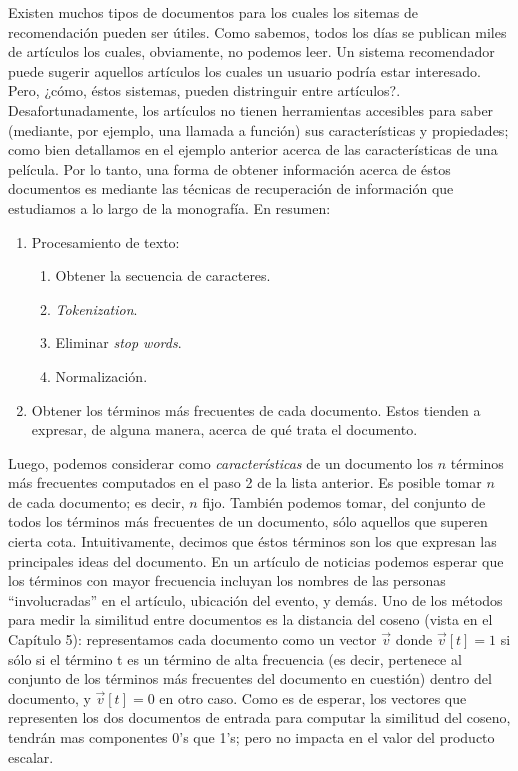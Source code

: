 			Existen muchos tipos de documentos para los cuales los sitemas de recomendación pueden ser útiles. Como sabemos, todos los días se publican miles de artículos los cuales, obviamente, no podemos leer. Un sistema recomendador puede sugerir aquellos artículos los cuales un usuario podría estar interesado. Pero, ¿cómo, éstos sistemas, pueden distringuir entre artículos?. Desafortunadamente, los artículos no tienen herramientas accesibles para saber (mediante, por ejemplo, una llamada a función) sus características y propiedades; como bien detallamos en el ejemplo anterior acerca de las características de una película. Por lo tanto, una forma de obtener información acerca de éstos documentos es mediante las técnicas de recuperación de información que estudiamos a lo largo de la monografía. En resumen:
			\begin{enumerate}
				\item Procesamiento de texto:
					\begin{enumerate}
						\item Obtener la secuencia de caracteres.
						\item \textit{Tokenization}.
						\item Eliminar \textit{stop words}.
						\item Normalización.
					\end{enumerate}			
				 \item Obtener los términos más frecuentes de cada documento. Estos tienden a expresar, de alguna manera, acerca de qué trata el documento.					
			\end{enumerate}
			Luego, podemos considerar como \textit{características} de un documento los $n$ términos más frecuentes computados en el paso 2 de la lista anterior. Es posible tomar $n$ de cada documento; es decir, $n$ fijo. También podemos tomar, del conjunto de todos los términos más frecuentes de un documento, sólo aquellos que superen cierta cota. Intuitivamente, decimos que éstos términos son los que expresan las principales ideas del documento. En un artículo de noticias podemos esperar que los términos con mayor frecuencia incluyan los nombres de las personas \enquote{involucradas} en el artículo, ubicación del evento, y demás. Uno de los métodos para medir la similitud entre documentos es la distancia del coseno (vista en el Capítulo 5): representamos cada documento como un vector $\vec{v}$ donde $\vec{v}[t] = 1$ si sólo si el término t es un término de alta frecuencia (es decir, pertenece al conjunto de los términos más frecuentes del documento en cuestión) dentro del documento, y $\vec{v}[t] = 0$ en otro caso. Como es de esperar, los vectores que representen los dos documentos de entrada para computar la similitud del coseno, tendrán mas componentes 0's que 1's; pero no impacta en el valor del producto escalar. \par
			
